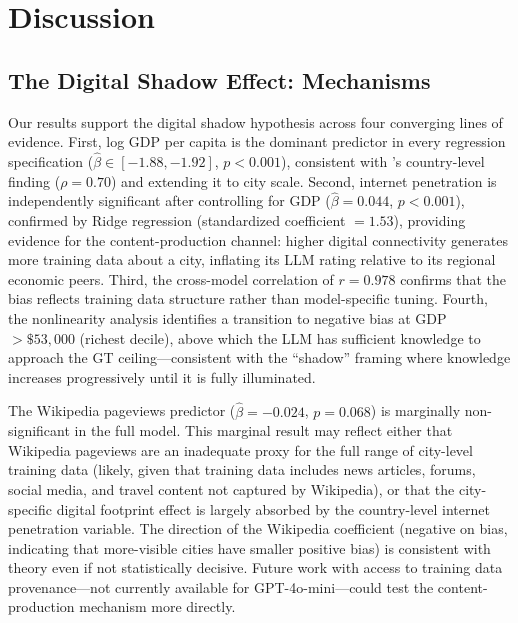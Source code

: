 \documentclass[12pt]{article}
\begin{document}
\section{Discussion}
\label{sec:discussion}

\subsection{The Digital Shadow Effect: Mechanisms}

Our results support the digital shadow hypothesis across four converging lines of evidence. First, log GDP per capita is the dominant predictor in every regression specification ($\hat{\beta} \in [-1.88, -1.92]$, $p < 0.001$), consistent with \citet{manvi2024geographically}'s country-level finding ($\rho = 0.70$) and extending it to city scale. Second, internet penetration is independently significant after controlling for GDP ($\hat{\beta} = 0.044$, $p < 0.001$), confirmed by Ridge regression (standardized coefficient $= 1.53$), providing evidence for the content-production channel: higher digital connectivity generates more training data about a city, inflating its LLM rating relative to its regional economic peers. Third, the cross-model correlation of $r = 0.978$ confirms that the bias reflects training data structure rather than model-specific tuning. Fourth, the nonlinearity analysis identifies a transition to negative bias at GDP $> \$53,000$ (richest decile), above which the LLM has sufficient knowledge to approach the GT ceiling---consistent with the ``shadow'' framing where knowledge increases progressively until it is fully illuminated.

The Wikipedia pageviews predictor ($\hat{\beta} = -0.024$, $p = 0.068$) is marginally non-significant in the full model. This marginal result may reflect either that Wikipedia pageviews are an inadequate proxy for the full range of city-level training data (likely, given that training data includes news articles, forums, social media, and travel content not captured by Wikipedia), or that the city-specific digital footprint effect is largely absorbed by the country-level internet penetration variable. The direction of the Wikipedia coefficient (negative on bias, indicating that more-visible cities have smaller positive bias) is consistent with theory even if not statistically decisive. Future work with access to training data provenance---not currently available for GPT-4o-mini---could test the content-production mechanism more directly.
\end{document}
